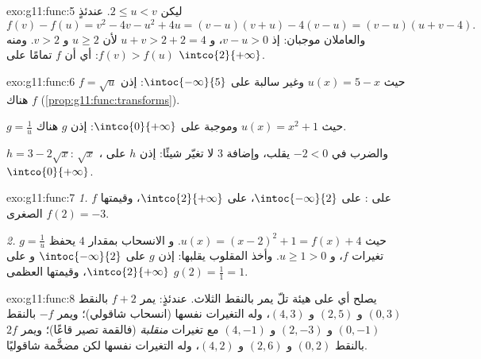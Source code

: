 \begin{solution}{exo:g11:func:5}
ليكن $2 \leq u < v$. عندئذٍ
\[
f(v) - f(u) = v^2 - 4v - u^2 + 4u = (v-u)(v+u) - 4(v-u)
= (v - u)(u + v - 4).
\]
والعاملان موجبان: إذ $v - u > 0$، و $u + v > 2 + 2 = 4$ لأن
$u \geq 2$ و $v > 2$. ومنه $f(v) > f(u)$: أي أن $f$  تمامًا
على $\intco{2}{+\infty}$.
\end{solution}

\begin{solution}{exo:g11:func:6}
$f = \sqrt{u}$ حيث $u(x) = 5 - x$  وغير سالبة على
$\intoc{-\infty}{5}$: إذن $f$  هناك
(\cref{prop:g11:func:transforms}).

$g = \frac1u$ حيث $u(x) = x^2 + 1$  وموجبة على
$\intco{0}{+\infty}$: إذن $g$  هناك.

$h = 3 - 2\sqrt x$:  $\sqrt x$ ، والضرب في $-2 < 0$
يقلب، وإضافة $3$ لا تغيّر شيئًا: إذن $h$  على
$\intco{0}{+\infty}$.
\end{solution}

\begin{solution}{exo:g11:func:7}
\emph{1.}  $f$ على :  على $\intoc{-\infty}{2}$،
 على $\intco{2}{+\infty}$، وقيمتها الصغرى $f(2) = -3$.

\emph{2.} $g = \frac{1}{u}$ حيث $u(x) = (x-2)^2 + 1 = f(x) + 4$. و
الانسحاب بمقدار $4$ يحفظ تغيرات $f$، و $u \geq 1 > 0$. وأخذ
المقلوب يقلبها: إذن $g$  على $\intoc{-\infty}{2}$ و
 على $\intco{2}{+\infty}$، وقيمتها العظمى
$g(2) = \frac{1}{1} = 1$.
\end{solution}

\begin{solution}{exo:g11:func:8}
يصلح أي  على هيئة تلّ يمر بالنقط الثلاث. عندئذٍ:
يمر $f + 2$ بالنقط $(0,3)$ و $(2,5)$ و $(4,3)$، وله التغيرات نفسها
(انسحاب شاقولي)؛ ويمر $-f$ بالنقط $(0,-1)$ و $(2,-3)$ و $(4,-1)$ مع
تغيرات \emph{منقلبة} (فالقمة تصير قاعًا)؛ ويمر $2f$
بالنقط $(0,2)$ و $(2,6)$ و $(4,2)$، وله التغيرات نفسها لكن مضخَّمة
شاقوليًا.
\end{solution}

